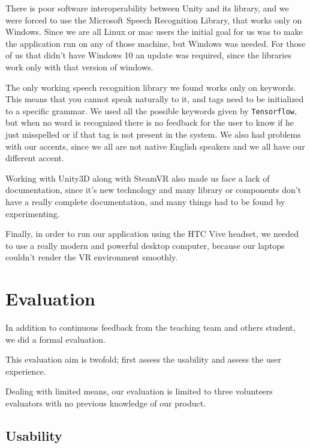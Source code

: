 \documentclass[11pt,a4paper]{article}
\begin{document}
There is poor software interoperability between Unity and its library, and we were forced to use the Microsoft Speech Recognition Library, that works only on Windows. 
Since we are all Linux or mac users the initial goal for us was to make the application run on any of those machine, but Windows was needed.
For those of us that didn't have Windows 10 an update was required, since the libraries work only with that version of windows.

The only working speech recognition library we found works only on keywords. This means that you cannot speak naturally to it, and tags need to be initialized to a specific grammar. We used all the possible keywords given by \texttt{Tensorflow}, but when no word is recognized there is no feedback for the user to know if he just misspelled or if that tag is not present in the system.
We also had problems with our accents, since we all are not native English speakers and we all have our different accent.

Working with Unity3D along with SteamVR also made us face a lack of documentation, since it's new technology and many library or components don't have a really complete documentation, and many things had to be found by experimenting.

Finally, in order to run our application using the HTC Vive headset, we needed to use a really modern and powerful desktop computer, because our laptops couldn't render the VR environment smoothly.

\section{Evaluation} \label{eval}

In addition to continuous feedback from the teaching team and others student, we did a formal evaluation.

This evaluation aim is twofold; first assess the usability and assess the user experience.

Dealing with limited means, our evaluation is limited to three volunteers evaluators with no previous knowledge of our product.





\subsection{Usability}
\end{document}
